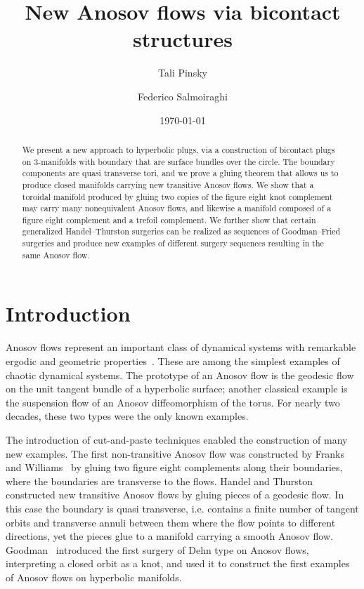 \documentclass{amsart}
\title{New Anosov flows via bicontact structures}
\author{Tali Pinsky}
\author{Federico Salmoiraghi}
\date{\today}
\theoremstyle{definition}
\theoremstyle{remark}
\begin{document}
\begin{abstract}

We present a new approach to hyperbolic plugs, via a construction of bicontact plugs on 3-manifolds with boundary that are surface bundles over the circle. The boundary components are quasi transverse tori, and we prove a gluing theorem that allows us to produce closed manifolds carrying new transitive Anosov flows. We show that a toroidal manifold produced by gluing two copies of the figure eight knot complement may carry many nonequivalent Anosov flows, and likewise a manifold composed of a figure eight complement and a trefoil complement.
We further show that certain generalized Handel--Thurston surgeries can be realized as sequences of Goodman--Fried surgeries and produce new examples of different surgery sequences resulting in the same Anosov flow.
\end{abstract}


\maketitle

\section{Introduction}

Anosov flows represent an important class of dynamical systems with remarkable ergodic and geometric properties~\cite{Ano1}. These are among the simplest examples of chaotic dynamical systems.
The prototype of an Anosov flow is the geodesic flow on the unit tangent bundle of a hyperbolic surface; another classical example is the suspension flow of an Anosov diffeomorphism of the torus. 
For nearly two decades, these two types were the only known examples.

The introduction of cut-and-paste techniques enabled the construction of many new examples. The first non-transitive Anosov flow was constructed by Franks and Williams~\cite{FranksWilliams1979} by gluing two figure eight complements along their boundaries, where the boundaries are transverse to the flows. Handel and Thurston~\cite{HandelThurston1980} constructed new transitive Anosov flows by gluing pieces of a geodesic flow. In this case the boundary is quasi transverse, i.e. contains a finite number of tangent orbits and transverse annuli between them where the flow points to different directions, yet the pieces glue to a manifold carrying a smooth Anosov flow.
Goodman~\cite{Goo} introduced the first surgery of Dehn type on Anosov flows, interpreting a closed orbit as a knot, and used it to construct the first examples of Anosov flows on hyperbolic manifolds.
\end{document}
